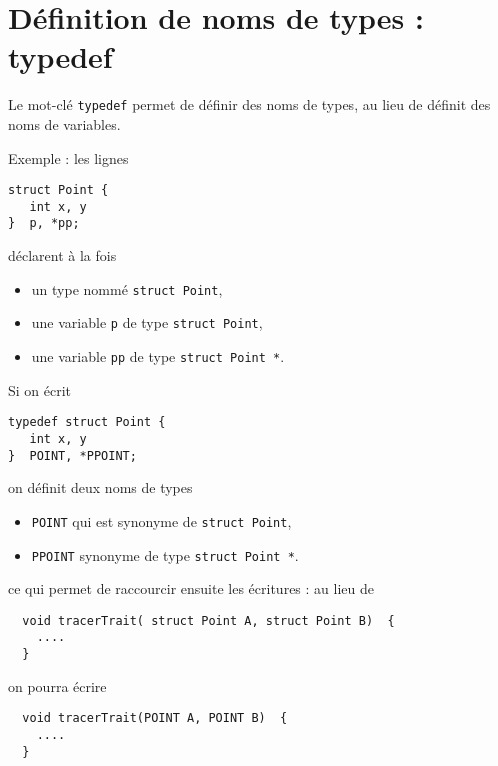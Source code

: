 \documentclass[10pt]{article}
\begin{document}


\section{Définition de noms de types : typedef}

Le mot-clé \texttt{typedef} permet de définir des noms de types, au
lieu de définit des noms de variables.

Exemple : les lignes 
\begin{lstlisting}
struct Point {
   int x, y
}  p, *pp;
\end{lstlisting}
déclarent à la fois
\begin{itemize}
\item un type nommé \texttt{struct Point},
\item une variable \texttt{p} de type \texttt{struct Point},
\item une variable \texttt{pp} de type \texttt{struct Point *}.
\end{itemize}

Si on écrit
\begin{lstlisting}
typedef struct Point {
   int x, y
}  POINT, *PPOINT;
\end{lstlisting}
on définit deux noms de types
\begin{itemize}
\item \texttt{POINT} qui est synonyme de  \texttt{struct Point},
\item \texttt{PPOINT} synonyme de type \texttt{struct Point *}.
\end{itemize}

ce qui permet de raccourcir ensuite les écritures : au lieu de
\begin{lstlisting}
  void tracerTrait( struct Point A, struct Point B)  {
    ....
  }
\end{lstlisting}
on pourra écrire
\begin{lstlisting}
  void tracerTrait(POINT A, POINT B)  {
    ....
  }
\end{lstlisting}
\end{document}
